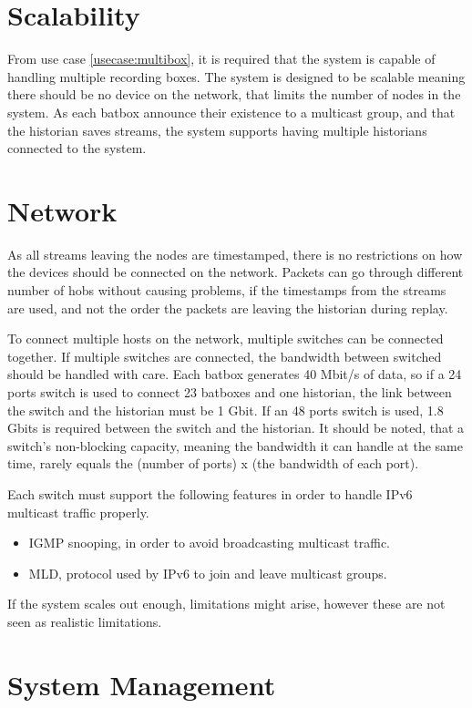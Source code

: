 \section{Scalability}
From use case \ref{usecase:multibox}, it is required that the system is capable of handling multiple recording boxes. The system is designed to be scalable meaning there should be no device on the network, that limits the number of nodes in the system. As each batbox announce their existence to a multicast group, and that the historian saves streams, the system supports having multiple historians connected to the system. 

\section{Network}
As all streams leaving the nodes are timestamped, there is no restrictions on how the devices should be connected on the network. Packets can go through different number of hobs without causing problems, if the timestamps from the streams are used, and not the order the packets are leaving the historian during replay.

To connect multiple hosts on the network, multiple switches can be connected together. If multiple switches are connected, the bandwidth between switched should be handled with care. Each batbox generates 40 Mbit/s of data, so if a 24 ports switch is used to connect 23 batboxes and one historian, the link between the switch and the historian must be 1 Gbit. If an 48 ports switch is used, 1.8 Gbits is required between the switch and the historian. It should be noted, that a switch's non-blocking capacity, meaning the bandwidth it can handle at the same time, rarely equals the (number of ports) x (the bandwidth of each port).

Each switch must support the following features in order to handle IPv6 multicast traffic properly.

\begin{itemize}
	 \item IGMP snooping, in order to avoid broadcasting multicast traffic.
	 \item MLD, protocol used by IPv6 to join and leave multicast groups.
\end{itemize}

If the system scales out enough, limitations might arise, however these are not seen as realistic limitations.

\section{System Management}

